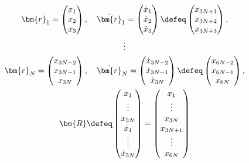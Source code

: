 \documentclass[openany, a4paper, oneside]{jsbook}
\begin{document}
\begin{gather}
\bm{r}_1 =
\begin{pmatrix}
x_1 \\
x_2 \\
x_3 \\
\end{pmatrix}
, \quad
\dot{ \bm{r} }_1
=
\begin{pmatrix}
\dot{ x }_1 \\
\dot{ x }_2 \\
\dot{ x }_3 \\
\end{pmatrix}
\defeq
\begin{pmatrix}
x_{3N+1} \\
x_{3N+2} \\
x_{3N+3}\\
\end{pmatrix} , \\
\vdots \\
\bm{r}_N =
\begin{pmatrix}
x_{3N-2} \\
x_{3N-1} \\
x_{3N} \\
\end{pmatrix}
, \quad
\dot{ \bm{r} }_N
=
\begin{pmatrix}
\dot{ x }_{3N-2} \\
\dot{ x }_{3N-1} \\
\dot{ x }_{3N} \\
\end{pmatrix}
\defeq
\begin{pmatrix}
x_{6N-2} \\
x_{6N-1} \\
x_{6N} \\
\end{pmatrix} , \\
\bm{R}
\defeq
\begin{pmatrix}
x_1 \\
\vdots \\
x_{3N} \\
\dot{x}_1 \\
\vdots \\
\dot{x}_{3N}
\end{pmatrix}
=
\begin{pmatrix}
x_1 \\
\vdots \\
x_{3N} \\
x_{3N+1} \\
\vdots \\
x_{6N}
\end{pmatrix}

\end{gather}
\end{document}
